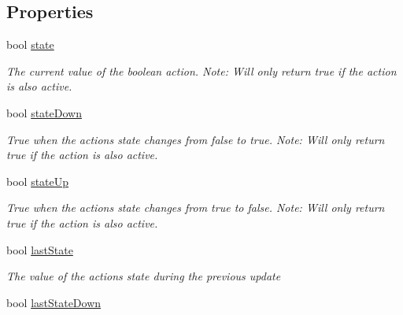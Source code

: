 \subsection*{Properties}
\begin{DoxyCompactItemize}
\item 
bool \mbox{\hyperlink{interface_valve_1_1_v_r_1_1_i_steam_v_r___action___boolean_a936d102fdc616563e56c42e0ff670910}{state}}
\begin{DoxyCompactList}\small\item\em The current value of the boolean action. Note\+: Will only return true if the action is also active. \end{DoxyCompactList}\item 
bool \mbox{\hyperlink{interface_valve_1_1_v_r_1_1_i_steam_v_r___action___boolean_a95e07d966b753918768675f67a057eb3}{state\+Down}}
\begin{DoxyCompactList}\small\item\em True when the action\textquotesingle{}s state changes from false to true. Note\+: Will only return true if the action is also active. \end{DoxyCompactList}\item 
bool \mbox{\hyperlink{interface_valve_1_1_v_r_1_1_i_steam_v_r___action___boolean_a85d9addfbe61e3f5258582a3532fb44d}{state\+Up}}
\begin{DoxyCompactList}\small\item\em True when the action\textquotesingle{}s state changes from true to false. Note\+: Will only return true if the action is also active. \end{DoxyCompactList}\item 
bool \mbox{\hyperlink{interface_valve_1_1_v_r_1_1_i_steam_v_r___action___boolean_a6b33097be2986b6ab9e7db94f771bfc4}{last\+State}}
\begin{DoxyCompactList}\small\item\em The value of the action\textquotesingle{}s \textquotesingle{}state\textquotesingle{} during the previous update \end{DoxyCompactList}\item 
bool \mbox{\hyperlink{interface_valve_1_1_v_r_1_1_i_steam_v_r___action___boolean_a108dd7a0603097b3a433876afc978b44}{last\+State\+Down}}

\end{DoxyCompactItemize}
